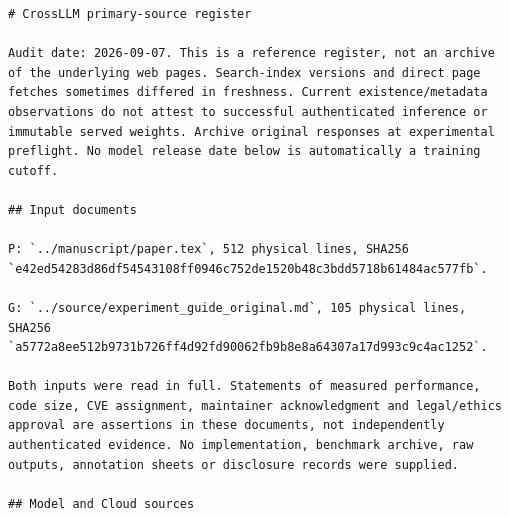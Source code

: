 \documentclass[11pt,a4paper]{article}
\begin{document}
\begin{verbatim}
# CrossLLM primary-source register

Audit date: 2026-09-07. This is a reference register, not an archive of the underlying web pages. Search-index versions and direct page fetches sometimes differed in freshness. Current existence/metadata observations do not attest to successful authenticated inference or immutable served weights. Archive original responses at experimental preflight. No model release date below is automatically a training cutoff.

## Input documents

P: `../manuscript/paper.tex`, 512 physical lines, SHA256 `e42ed54283d86df54543108ff0946c752de1520b48c3bdd5718b61484ac577fb`.

G: `../source/experiment_guide_original.md`, 105 physical lines, SHA256 `a5772a8ee512b9731b726ff4d92fd90062fb9b8e8a64307a17d993c9c4ac1252`.

Both inputs were read in full. Statements of measured performance, code size, CVE assignment, maintainer acknowledgment and legal/ethics approval are assertions in these documents, not independently authenticated evidence. No implementation, benchmark archive, raw outputs, annotation sheets or disclosure records were supplied.

## Model and Cloud sources


\end{verbatim}
\end{document}
